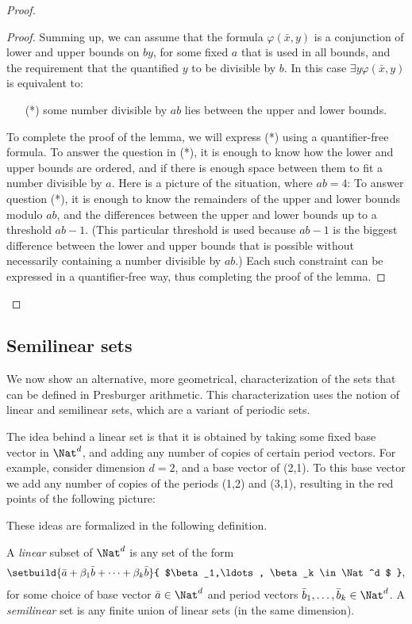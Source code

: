 \begin{proof}
\begin{proof}
		Summing up, we can assume that the formula $\varphi(\bar x, y)$ is a conjunction of lower and upper bounds on $by$, for some fixed $a$ that is used in all bounds, and the requirement that the quantified $y$ to be divisible by $b$. In this case $\exists y \varphi(\bar x, y)$ is equivalent to:
		\begin{itemize}
			\item[(*)]  some number divisible by $ab$ lies between the upper and lower bounds.
		\end{itemize}
		To complete the proof of the lemma, we will express (*) using a quantifier-free formula. To answer the question in (*), it is enough to know how the lower and upper bounds are ordered, and if there is enough space between them to fit a number divisible by $a$.   Here is a picture of the situation, where $ab=4$:
		To answer question (*), it is enough to know the remainders of the upper and lower bounds modulo $ab$, and the differences between the upper and lower bounds up to a threshold $ab-1$. (This particular threshold is used because $ab-1$ is the biggest difference between the lower and upper bounds that is possible without necessarily containing a number divisible by $ab$.) Each such constraint can be expressed in a quantifier-free way, thus completing the proof of the lemma. 
	\end{proof}
	
\end{proof}

\subsection{Semilinear sets}
We now show an alternative, more geometrical,  characterization of the sets that can be defined in Presburger arithmetic. This characterization uses the notion of linear and semilinear sets, which are a variant of periodic sets.

The idea behind a linear set is that it is obtained by taking some fixed base vector in $\Nat^d$, and adding any number of copies of certain period vectors. For example, consider dimension $d=2$, and a base vector of (2,1). To this base vector we add any number of copies of the periods (1,2) and (3,1), resulting in the red points of  the following picture:

These ideas are formalized in the following definition.

\begin{definition}\label{def:semilinear}
	A \emph{linear} subset of $\Nat^d$ is any set of the form
\begin{align*}
\setbuild{ \bar a + \beta_1 \bar b + \cdots + \beta_k \bar b}{
	$\beta_1,\ldots, \beta_k \in \Nat^d $
},
\end{align*}
for some choice of  base vector $\bar a \in \Nat^d$ and  period vectors $\bar b_1, \ldots, \bar b_k \in \Nat^d$. A \emph{semilinear} set is any finite  union of linear sets (in the same dimension).
\end{definition}



